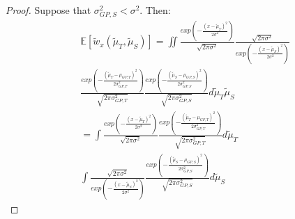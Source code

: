     \begin{proof}
      Suppose that $\sigma^{2}_{GP,S} < \sigma^{2}$. Then:
      \begin{equation}
        \begin{aligned}
          & \mathbb{E}[\tilde{w}_{x}(\tilde{\mu}_{T}, \tilde{\mu}_{S})] = \iint \frac{exp \left ( -\frac{(x-\tilde{\mu}_{T})^{2}}{2\sigma^{2}} \right )}{\sqrt{2\pi\sigma^{2}}} \frac{\sqrt{2\pi\sigma^{2}}}{exp \left ( -\frac{(x-\tilde{\mu}_{S})^{2}}{2\sigma^{2}} \right )} \\
          & \frac{exp \left ( -\frac{(\tilde{\mu}_{T}-\mu_{GP,T})^{2}}{2\sigma^{2}_{GP,T}} \right )}{\sqrt{2\pi\sigma^{2}_{GP,T}}} \frac{exp \left ( -\frac{(\tilde{\mu}_{S}-\mu_{GP,S})^{2}}{2\sigma^{2}_{GP,S}} \right )}{\sqrt{2\pi\sigma^{2}_{GP,S}}} d\tilde{\mu}_{T}\tilde{\mu}_{S} \\
          & = \int \frac{exp \left ( -\frac{(x-\tilde{\mu}_{T})^{2}}{2\sigma^{2}} \right )}{\sqrt{2\pi\sigma^{2}}} \frac{exp \left ( -\frac{(\tilde{\mu}_{T}-\mu_{GP,T})^{2}}{2\sigma^{2}_{GP,T}} \right )}{\sqrt{2\pi\sigma^{2}_{GP,T}}} d\tilde{\mu}_{T} \\
          & \int \frac{\sqrt{2\pi\sigma^{2}}}{exp \left ( -\frac{(x-\tilde{\mu}_{S})^{2}}{2\sigma^{2}} \right )} \frac{exp \left ( -\frac{(\tilde{\mu}_{S}-\mu_{GP,S})^{2}}{2\sigma^{2}_{GP,S}} \right )}{\sqrt{2\pi\sigma^{2}_{GP,S}}} d\tilde{\mu}_{S}
        \end{aligned}
      \end{equation}


\end{proof}
